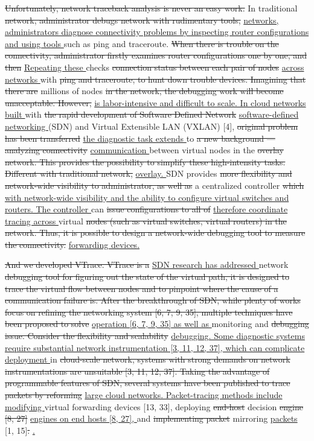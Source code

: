 \documentclass[11pt,a4paper]{article}
\newcommand{\deleted}[1]{{\color{deletion}\sout{#1}}}
\newcommand{\added}[1]{{\color{insertion}\uline{#1}}}
\begin{document}
\deleted{Unfortunately, network traceback analysis is never an easy work. }In traditional \deleted{network, administrator debugs network with rudimentary tools, }\added{networks, administrators diagnose connectivity problems by inspecting router configurations and using tools }such as ping and traceroute. \deleted{When there is trouble on the connectivity, administrator firstly examines router configurations one by one, and then }\added{Repeating these }checks \deleted{connection status between each pair of nodes }\added{across networks }with \deleted{ping and traceroute, to hunt down trouble devices. Imagining that there are }millions of nodes \deleted{in the network, the debugging work will become unacceptable. However, }\added{is labor-intensive and difficult to scale. In cloud networks built }with \deleted{the rapid development of Software Defined Network }\added{software-defined networking }(SDN) and Virtual Extensible LAN (VXLAN) [4], \deleted{original problem has been transferred }\added{the diagnostic task extends }to \deleted{a new background --- analyzing connectivity }\added{communication }between virtual nodes in the \deleted{overlay network. This provides the possibility to simplify these high-intensity tasks. Different with traditional network, }\added{overlay. }SDN provides \deleted{more flexibility and network-wide visibility to administrator, as well as }a centralized controller \deleted{which }\added{with network-wide visibility and the ability to configure virtual switches and routers. The controller }can \deleted{issue configurations to all of }\added{therefore coordinate tracing across }virtual \deleted{nodes (such as virtual switches, virtual routers) in the network. Thus, it is possible to design a network-wide debugging tool to measure the connectivity. }\added{forwarding devices.}

\deleted{And we developed VTrace. VTrace is a }\added{SDN research has addressed }network \deleted{debugging tool for figuring out the state of the virtual path, it is designed to trace the virtual flow between nodes and to pinpoint where the cause of a communication failure is. After the breakthrough of SDN, while plenty of works focus on refining the networking system [6, 7, 9, 35], multiple techniques have been proposed to solve }\added{operation [6, 7, 9, 35] as well as }monitoring and \deleted{debugging issue. Consider the flexibility and scalability }\added{debugging. Some diagnostic systems require substantial network instrumentation [3, 11, 12, 37], which can complicate deployment }in \deleted{cloud-scale network, systems with strong demands on network instrumentations are unsuitable [3, 11, 12, 37]. Taking the advantage of programmable features of SDN, several systems have been published to trace packets by reforming }\added{large cloud networks. Packet-tracing methods include modifying }virtual forwarding devices [13, 33], deploying \deleted{end-host }decision \deleted{engine [8, 27] }\added{engines on end hosts [8, 27], }and \deleted{implementing packet }mirroring \added{packets }[1, 15]\deleted{. }\added{.}
\end{document}
